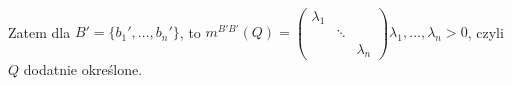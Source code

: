 \begin{dd}
\begin{itemize}
\begin{itemize}
                                    \\ Zatem dla $B' = \{b_1',\ldots,b_n'\}$, to 
                                    $m^{B'B'}(Q) = \begin{pmatrix} \lambda_1 & & 
                                    \\ & \ddots & \\ & & \lambda_n \end{pmatrix}
                                    \lambda_1,\ldots,\lambda_n > 0$, czyli $Q$ dodatnie
                                    określone. 
                            \end{itemize} 
    \end{itemize} 
\end{dd} 
